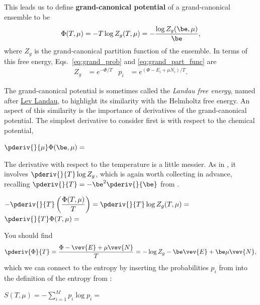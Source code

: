 \begin{shaded}
  This leads us to define \textbf{grand-canonical potential} of a grand-canonical ensemble to be
  \begin{equation}
    \label{eq:grand_pot}
    \Phi(T, \mu) = -T \log Z_g(T, \mu) = -\frac{\log Z_g(\be, \mu)}{\be},
  \end{equation}
  where $Z_g$ is the grand-canonical partition function of the ensemble.
  In terms of this free energy, Eqs.~\ref{eq:grand_prob} and \ref{eq:grand_part_func} are
  \begin{align*}
    Z_g & = e^{-\Phi / T} &
    p_i & = e^{(\Phi - E_i + \mu N_i) / T}.
  \end{align*}
\end{shaded}

The grand-canonical potential is sometimes called the \textit{Landau free energy}, named after \href{https://en.wikipedia.org/wiki/Lev_Landau}{Lev Landau}, to highlight its similarity with the Helmholtz free energy.
\newpage %
\noindent An aspect of this similarity is the importance of derivatives of the grand-canonical potential.
The simplest derivative to consider first is with respect to the chemical potential,
\begin{mdframed}
  $\displaystyle \pderiv{}{\mu} \Phi(\be, \mu) = $ \\[120 pt]
\end{mdframed}
The derivative with respect to the temperature is a little messier.
As in , it involves $\pderiv{}{T} \log Z_g$, which is again worth collecting in advance, recalling $\pderiv{}{T} = -\be^2 \pderiv{}{\be} $ from .
\begin{mdframed}
  $\displaystyle -\pderiv{}{T}\left(\frac{\Phi(T, \mu)}{T}\right) = \pderiv{}{T} \log Z_g(T, \mu) = $ \\[80 pt]
  $\displaystyle \pderiv{}{T} \Phi(T, \mu) = $ \\[80 pt]
\end{mdframed}
\newpage %
\noindent You should find
\begin{equation*}
  \pderiv{\Phi}{T} = \frac{\Phi - \vev{E} + \mu\vev{N}}{T} = -\log Z_g - \be\vev{E} + \be\mu\vev{N},
\end{equation*}
which we can connect to the entropy by inserting the probabilities $p_i$ from  into the definition of the entropy from :
\begin{mdframed}
  $\displaystyle S(T, \mu) = -\sum_{i = 1}^M p_i \log p_i = $ \\[100 pt]
\end{mdframed}

